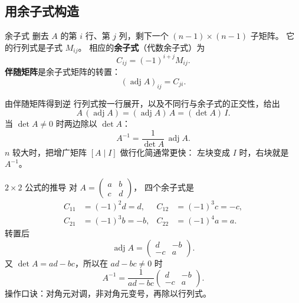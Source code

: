 \documentclass[fontset=windows, chinese, 10pt, xcolor=dvipsnames]{beamer}
\begin{document}
\subsection{用余子式构造}

\begin{frame}{余子式}
  删去 $A$ 的第 $i$ 行、第 $j$ 列，剩下一个 $(n-1)\times(n-1)$ 子矩阵。
  它的行列式是子式 $M_{ij}$。
  相应的\textbf{余子式}（代数余子式）为
  \begin{equation*}
    C_{ij}=(-1)^{i+j}M_{ij}.
  \end{equation*}
  \textbf{伴随矩阵}是余子式矩阵的转置：
  \begin{equation*}
    (\operatorname{adj} A)_{ij}=C_{ji}.
  \end{equation*}
\end{frame}

\begin{frame}{由伴随矩阵得到逆}
  行列式按一行展开，以及不同行与余子式的正交性，给出
  \begin{equation*}
    A\,(\operatorname{adj} A)
    =(\operatorname{adj} A)\,A
    =(\det A)\,I.
  \end{equation*}
  当 $\det A\neq 0$ 时两边除以 $\det A$：
  \begin{equation*}
    A^{-1}
    =\frac{1}{\det A}\,\operatorname{adj} A.
  \end{equation*}
  $n$ 较大时，把增广矩阵 $[A\mid I]$ 做行化简通常更快：
  左块变成 $I$ 时，右块就是 $A^{-1}$。
\end{frame}

\begin{frame}{$2\times 2$ 公式的推导}
  对
  $A=\begin{pmatrix}a&b\\c&d\end{pmatrix}$，
  四个余子式是
  \begin{align*}
    C_{11}&=(-1)^{2}d=d, &
    C_{12}&=(-1)^{3}c=-c,\\
    C_{21}&=(-1)^{3}b=-b, &
    C_{22}&=(-1)^{4}a=a.
  \end{align*}
  转置后
  \begin{equation*}
    \operatorname{adj} A
    =
    \begin{pmatrix} d & -b \\ -c & a \end{pmatrix}.
  \end{equation*}
  又 $\det A=ad-bc$，所以在 $ad-bc\neq 0$ 时
  \begin{equation*}
    A^{-1}
    =\frac{1}{ad-bc}
    \begin{pmatrix} d & -b \\ -c & a \end{pmatrix}.
  \end{equation*}
  操作口诀：对角元对调，非对角元变号，再除以行列式。
\end{frame}
\end{document}
